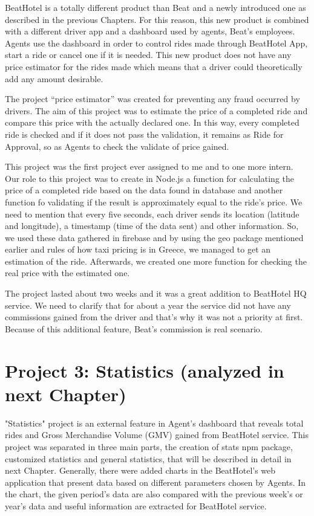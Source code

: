 BeatHotel is a totally different product than Beat and a newly introduced one as described in the previous Chapters. For this reason, this new product is combined with a different driver app and a dashboard used by agents, Beat's employees. Agents use the dashboard in order to control rides made through BeatHotel App, start a ride or cancel one if it is needed. This new product does not have any price estimator for the rides made which means that a driver could theoretically add any amount desirable. \par

The project “price estimator” was created for preventing any fraud occurred by drivers. The aim of this project was to estimate the price of a completed ride and compare this price with the actually declared one. In this way, every completed ride is checked  and if it does not pass the validation, it remains as Ride for Approval, so as Agents to check the validate of price gained. \par

This project was the first project ever assigned to me and to one more intern. Our role to this project was to create in Node.js a function for calculating the price of a completed ride based on the data found in database and another function fo validating if the result is approximately equal to the ride's price. We need to mention that every five seconds, each driver sends its location (latitude and longitude), a timestamp (time of the data sent) and other information. So, we used these data gathered in firebase and by using the geo package mentioned earlier and rules of how taxi pricing is in Greece, we managed to get an estimation of the ride. Afterwards, we created one more function for checking the real price with the estimated one. \par

The project lasted about two weeks and it was a great addition to BeatHotel HQ service. We need to clarify that for about a year the service did not have any commissions gained from the driver and that's why it was not a priority at first. Because of this additional feature, Beat's commission is real scenario. \par 

\section{Project 3: Statistics (analyzed in next Chapter)}

"Statistics" project is an external feature in Agent's dashboard that reveals total rides and Gross Merchandise Volume (GMV) gained from BeatHotel service. This project was separated in three main parts, the creation of stats npm package, customized statistics and general statistics, that will be described in detail in next Chapter. Generally, there were added charts in the BeatHotel's web application that present data based on different parameters chosen by Agents. In the chart, the given period's data are also compared with the previous week's or year's data and useful information are extracted for BeatHotel service.

